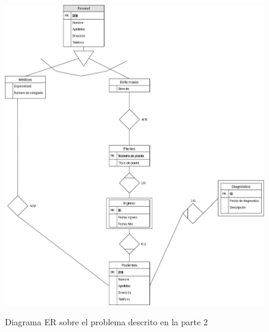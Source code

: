 \documentclass{article}
\begin{document}

\begin{figure}
\centering
\includegraphics[scale=0.5]{images/er_parte2_2.png}
\label{fig:er_parte2_2}
\caption{Diagrama ER sobre el problema descrito en la parte 2}
\end{figure}
\end{document}
